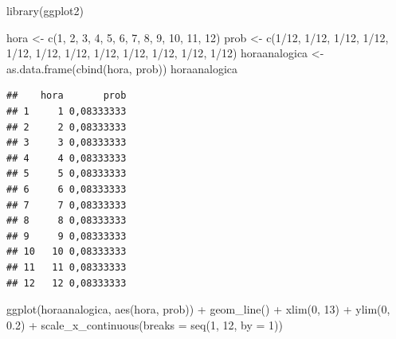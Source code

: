 \documentclass[
]{book}
\newenvironment{Shaded}{\begin{snugshade}}{\end{snugshade}}
\newcommand{\AttributeTok}[1]{\textcolor[rgb]{0.77,0.63,0.00}{#1}}
\newcommand{\DecValTok}[1]{\textcolor[rgb]{0.00,0.00,0.81}{#1}}
\newcommand{\FloatTok}[1]{\textcolor[rgb]{0.00,0.00,0.81}{#1}}
\newcommand{\FunctionTok}[1]{\textcolor[rgb]{0.00,0.00,0.00}{#1}}
\newcommand{\NormalTok}[1]{#1}
\newcommand{\OtherTok}[1]{\textcolor[rgb]{0.56,0.35,0.01}{#1}}
\newcommand{\SpecialCharTok}[1]{\textcolor[rgb]{0.00,0.00,0.00}{#1}}
\begin{document}
\begin{Shaded}
\begin{Highlighting}[]
\FunctionTok{library}\NormalTok{(ggplot2)}

\NormalTok{hora }\OtherTok{\textless{}{-}} \FunctionTok{c}\NormalTok{(}\DecValTok{1}\NormalTok{, }\DecValTok{2}\NormalTok{, }\DecValTok{3}\NormalTok{, }\DecValTok{4}\NormalTok{, }\DecValTok{5}\NormalTok{, }\DecValTok{6}\NormalTok{, }\DecValTok{7}\NormalTok{, }\DecValTok{8}\NormalTok{, }\DecValTok{9}\NormalTok{, }\DecValTok{10}\NormalTok{, }\DecValTok{11}\NormalTok{, }\DecValTok{12}\NormalTok{)}
\NormalTok{prob }\OtherTok{\textless{}{-}} \FunctionTok{c}\NormalTok{(}\DecValTok{1}\SpecialCharTok{/}\DecValTok{12}\NormalTok{, }\DecValTok{1}\SpecialCharTok{/}\DecValTok{12}\NormalTok{, }\DecValTok{1}\SpecialCharTok{/}\DecValTok{12}\NormalTok{, }\DecValTok{1}\SpecialCharTok{/}\DecValTok{12}\NormalTok{, }\DecValTok{1}\SpecialCharTok{/}\DecValTok{12}\NormalTok{, }\DecValTok{1}\SpecialCharTok{/}\DecValTok{12}\NormalTok{, }\DecValTok{1}\SpecialCharTok{/}\DecValTok{12}\NormalTok{, }
    \DecValTok{1}\SpecialCharTok{/}\DecValTok{12}\NormalTok{, }\DecValTok{1}\SpecialCharTok{/}\DecValTok{12}\NormalTok{, }\DecValTok{1}\SpecialCharTok{/}\DecValTok{12}\NormalTok{, }\DecValTok{1}\SpecialCharTok{/}\DecValTok{12}\NormalTok{, }\DecValTok{1}\SpecialCharTok{/}\DecValTok{12}\NormalTok{)}
\NormalTok{horaanalogica }\OtherTok{\textless{}{-}} \FunctionTok{as.data.frame}\NormalTok{(}\FunctionTok{cbind}\NormalTok{(hora, prob))}
\NormalTok{horaanalogica}
\end{Highlighting}
\end{Shaded}

\begin{verbatim}
##    hora       prob
## 1     1 0,08333333
## 2     2 0,08333333
## 3     3 0,08333333
## 4     4 0,08333333
## 5     5 0,08333333
## 6     6 0,08333333
## 7     7 0,08333333
## 8     8 0,08333333
## 9     9 0,08333333
## 10   10 0,08333333
## 11   11 0,08333333
## 12   12 0,08333333
\end{verbatim}

\begin{Shaded}
\begin{Highlighting}[]
\FunctionTok{ggplot}\NormalTok{(horaanalogica, }\FunctionTok{aes}\NormalTok{(hora, prob)) }\SpecialCharTok{+} \FunctionTok{geom\_line}\NormalTok{() }\SpecialCharTok{+} 
    \FunctionTok{xlim}\NormalTok{(}\DecValTok{0}\NormalTok{, }\DecValTok{13}\NormalTok{) }\SpecialCharTok{+} \FunctionTok{ylim}\NormalTok{(}\DecValTok{0}\NormalTok{, }\FloatTok{0.2}\NormalTok{) }\SpecialCharTok{+} \FunctionTok{scale\_x\_continuous}\NormalTok{(}\AttributeTok{breaks =} \FunctionTok{seq}\NormalTok{(}\DecValTok{1}\NormalTok{, }
    \DecValTok{12}\NormalTok{, }\AttributeTok{by =} \DecValTok{1}\NormalTok{))}
\end{Highlighting}
\end{Shaded}
\end{document}

